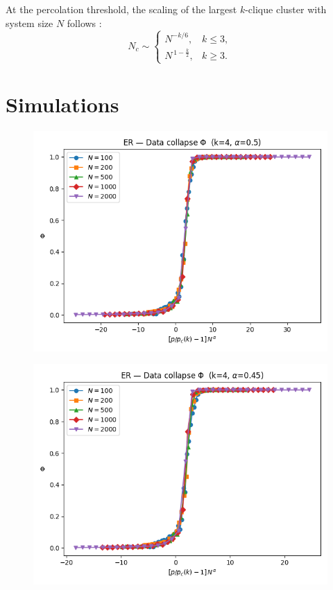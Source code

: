 At the percolation threshold, the scaling of the largest $k$-clique cluster 
with system size $N$ follows \cite{derenyi2005clique}:
\[
N_c \sim 
\begin{cases}
    N^{-k/6}, & k \leq 3, \\
    N^{\,1 - \tfrac{k}{2}}, & k \geq 3.
\end{cases}
\]

\section{Simulations}

\begin{figure}[h!]
    \centering
    \setlength{\tabcolsep}{2pt}
    \begin{minipage}[t]{0.48\textwidth}
        \centering
        \includegraphics[width=\textwidth]{images/IMAGES TASK2/ER_collapse_phi_k4_alpha0.5.png}
        \label{fig:collapse_alpha045}
    \end{minipage}
    \hfill
    \begin{minipage}[t]{0.48\textwidth}
        \centering
        \includegraphics[width=\textwidth]{images/IMAGES TASK2/ER_collapse_phi_k4_alpha0.45.png}

\end{minipage}
\end{figure}
